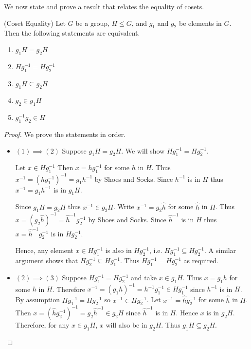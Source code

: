We now state and prove a result that relates the equality of cosets.
\begin{lemma}\label{lemma-coset-equality}(Coset Equality)
    Let $G$ be a group, $H \leq G$, and $g_1$ and $g_2$ be elements in $G$. Then the following statements are equivalent.
    \begin{enumerate}[label=$(\arabic*)$]
        \item $g_1H = g_2H$
        \item $Hg_1^{-1} = Hg_2^{-1}$
        \item $g_1H \subseteq g_2H$
        \item $g_2 \in g_1H$
        \item $g_1^{-1}g_2 \in H$
    \end{enumerate}
\end{lemma}
\begin{proof}
    We prove the statements in order.

    \begin{itemize}
        \item $\boxed{(1) \implies (2)}$ Suppose $g_1H = g_2H$. We will show $Hg_1^{-1} = Hg_2^{-1}$.

        Let $x \in Hg_1^{-1}$ Then $x = hg_1^{-1}$ for some $h$ in $H$. Thus $x^{-1} = \left(hg_1^{-1}\right)^{-1} = g_1h^{-1}$ by Shoes and Socks. Since $h^{-1}$ is in $H$ thus $x^{-1} = g_1h^{-1}$ is in $g_1H$.

        Since $g_1H = g_2H$ thus $x^{-1} \in g_2H$. Write $x^{-1} = g_2\hat{h}$ for some $\hat{h}$ in $H$. Thus $x = (g_2\hat{h})^{-1} = \hat{h}^{-1}g_2^{-1}$ by Shoes and Socks. Since $\hat{h}^{-1}$ is in $H$ thus $x = \hat{h}^{-1}g_2^{-1}$ is in $Hg_2^{-1}$.

        Hence, any element $x \in Hg_1^{-1}$ is also in $Hg_2^{-1}$, i.e. $Hg_1^{-1} \subseteq Hg_2^{-1}$. A similar argument shows that $Hg_2^{-1} \subseteq Hg_1^{-1}$. Thus $Hg_1^{-1} = Hg_2^{-1}$ as required.

        \item $\boxed{(2) \implies (3)}$ Suppose $Hg_1^{-1} = Hg_2^{-1}$ and take $x \in g_1H$. Thus $x = g_1h$ for some $h$ in $H$. Therefore $x^{-1} = (g_1h)^{-1} = h^{-1}g_1^{-1} \in Hg_1^{-1}$ since $h^{-1}$ is in $H$. By assumption $Hg_1^{-1} = Hg_2^{-1}$ so $x^{-1} \in Hg_2^{-1}$. Let $x^{-1} = \hat{h}g_2^{-1}$ for some $\hat{h}$ in $H$. Then $x = \left(\hat{h}g_2^{-1}\right)^{-1} = g_2\hat{h}^{-1} \in g_2H$ since $\hat{h}^{-1}$ is in $H$. Hence $x$ is in $g_2H$. Therefore, for any $x \in g_1H$, $x$ will also be in $g_2H$. Thus $g_1H \subseteq g_2H$.


\end{itemize}
\end{proof}
